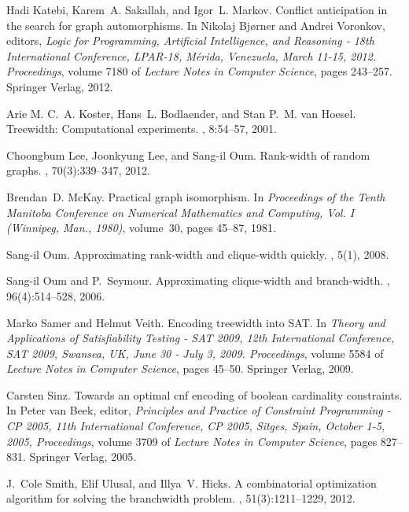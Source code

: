 \documentclass[10pt,usletter]{article}
\theoremstyle{remark}
\begin{document}
\begin{thebibliography}{10}
Hadi Katebi, Karem~A. Sakallah, and Igor~L. Markov.
\newblock Conflict anticipation in the search for graph automorphisms.
\newblock In Nikolaj Bj{\o}rner and Andrei Voronkov, editors, {\em Logic for
  Programming, Artificial Intelligence, and Reasoning - 18th International
  Conference, LPAR-18, M{\'e}rida, Venezuela, March 11-15, 2012. Proceedings},
  volume 7180 of {\em Lecture Notes in Computer Science}, pages 243--257.
  Springer Verlag, 2012.

Arie M. C.~A. Koster, Hans~L. Bodlaender, and Stan P.~M. van Hoesel.
\newblock Treewidth: Computational experiments.
, 8:54--57, 2001.

Choongbum Lee, Joonkyung Lee, and Sang-il Oum.
\newblock Rank-width of random graphs.
, 70(3):339--347, 2012.

Brendan~D. McKay.
\newblock Practical graph isomorphism.
\newblock In {\em Proceedings of the {T}enth {M}anitoba {C}onference on
  {N}umerical {M}athematics and {C}omputing, {V}ol. {I} ({W}innipeg, {M}an.,
  1980)}, volume~30, pages 45--87, 1981.

{Sang-il} Oum.
\newblock Approximating rank-width and clique-width quickly.
, 5(1), 2008.

{Sang-il} Oum and P.~Seymour.
\newblock Approximating clique-width and branch-width.
, 96(4):514--528, 2006.

Marko Samer and Helmut Veith.
\newblock Encoding treewidth into {SAT}.
\newblock In {\em Theory and Applications of Satisfiability Testing - SAT 2009,
  12th International Conference, SAT 2009, Swansea, UK, June 30 - July 3, 2009.
  Proceedings}, volume 5584 of {\em Lecture Notes in Computer Science}, pages
  45--50. Springer Verlag, 2009.

Carsten Sinz.
\newblock Towards an optimal cnf encoding of boolean cardinality constraints.
\newblock In Peter van Beek, editor, {\em Principles and Practice of Constraint
  Programming - CP 2005, 11th International Conference, CP 2005, Sitges, Spain,
  October 1-5, 2005, Proceedings}, volume 3709 of {\em Lecture Notes in
  Computer Science}, pages 827--831. Springer Verlag, 2005.

J.~Cole Smith, Elif Ulusal, and Illya~V. Hicks.
\newblock A combinatorial optimization algorithm for solving the branchwidth
  problem.
, 51(3):1211--1229, 2012.


\end{thebibliography}
\end{document}
